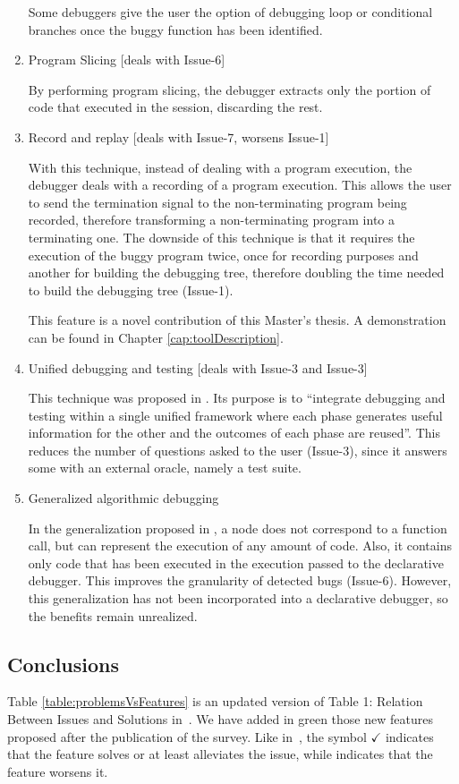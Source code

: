 \begin{enumerate}
Some debuggers give the user the option of debugging loop or conditional branches once the buggy function has been identified.
\item Program Slicing [deals with Issue-6]

By performing program slicing, the debugger extracts only the portion of code that executed in the session, discarding the rest.
\item Record and replay [deals with Issue-7, worsens Issue-1]

With this technique, instead of dealing with a program execution, the debugger deals with a recording of a program execution. This allows the user to send the termination signal to the non-terminating program being recorded, therefore transforming a non-terminating program into a terminating one.
The downside of this technique is that it requires the execution of the buggy program twice, once for recording purposes and another for building the debugging tree, therefore doubling the time needed to build the debugging tree (Issue-1).

This feature is a novel contribution of this Master's thesis. A demonstration can be found in Chapter \ref{cap:toolDescription}.
\item Unified debugging and testing [deals with Issue-3 and Issue-3]

This technique was proposed in \cite{unifiedFrameworkDeclarativeDebuggingTesting}. Its purpose is to ``integrate debugging and testing within a single unified framework where each phase generates useful information for the other and the outcomes of each phase are reused''.
This reduces the number of questions asked to the user (Issue-3), since it answers some with an external oracle, namely a test suite.
\item Generalized algorithmic debugging

In the generalization proposed in \cite{AlgorithmicDebuggingGeneralized}, a node does not correspond to a function call, but can represent the execution of any amount of code. Also, it contains only code that has been executed in the execution passed to the declarative debugger. This improves the granularity of detected bugs (Issue-6).
However, this generalization has not been incorporated into a declarative debugger, so the benefits remain unrealized.
\end{enumerate}
\subsection{Conclusions}
Table \ref{table:problemsVsFeatures} is an updated version of Table 1: Relation Between Issues and Solutions in~\cite{Survey}. We have added in green those new features proposed after the publication of the survey. Like in~\cite{Survey}, the symbol \(\checkmark\) indicates that the feature solves or at least alleviates the issue, while  indicates that the feature worsens it. 

